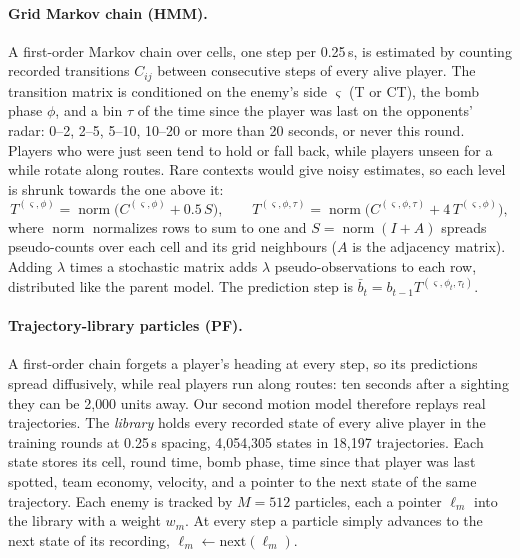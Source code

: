 \documentclass[11pt]{article}
\newcommand{\model}[1]{\textsc{#1}}
\newcommand{\norm}{\operatorname{norm}}
\newcommand{\1}{\mathbb{1}}
\begin{document}
\paragraph{Grid Markov chain (\model{HMM}).} A first-order Markov chain over cells, one step per 0.25\,s, is estimated by counting recorded transitions $C_{ij}$ between consecutive steps of every alive player. The transition matrix is conditioned on the enemy's side $\varsigma$ (T or CT), the bomb phase $\phi$, and a bin $\tau$ of the time since the player was last on the opponents' radar: 0--2, 2--5, 5--10, 10--20 or more than 20 seconds, or never this round. Players who were just seen tend to hold or fall back, while players unseen for a while rotate along routes. Rare contexts would give noisy estimates, so each level is shrunk towards the one above it:
\begin{equation}
  T^{(\varsigma,\phi)} = \norm\!\big(C^{(\varsigma,\phi)} + 0.5\, S\big), \qquad
  T^{(\varsigma,\phi,\tau)} = \norm\!\big(C^{(\varsigma,\phi,\tau)} + 4\, T^{(\varsigma,\phi)}\big),
  \label{eq:shrink}
\end{equation}
where $\norm$ normalizes rows to sum to one and $S = \norm(I + A)$ spreads pseudo-counts over each cell and its grid neighbours ($A$ is the adjacency matrix). Adding $\lambda$ times a stochastic matrix adds $\lambda$ pseudo-observations to each row, distributed like the parent model. The prediction step is $\bar b_t = b_{t-1} T^{(\varsigma,\phi_t,\tau_t)}$.

\paragraph{Trajectory-library particles (\model{PF}).} A first-order chain forgets a player's heading at every step, so its predictions spread diffusively, while real players run along routes: ten seconds after a sighting they can be 2{,}000 units away. Our second motion model therefore replays real trajectories. The \emph{library} holds every recorded state of every alive player in the training rounds at 0.25\,s spacing, 4{,}054{,}305 states in 18{,}197 trajectories. Each state stores its cell, round time, bomb phase, time since that player was last spotted, team economy, velocity, and a pointer to the next state of the same trajectory. Each enemy is tracked by $M = 512$ particles, each a pointer $\ell_m$ into the library with a weight $w_m$. At every step a particle simply advances to the next state of its recording, $\ell_m \leftarrow \mathrm{next}(\ell_m)$.
\end{document}
